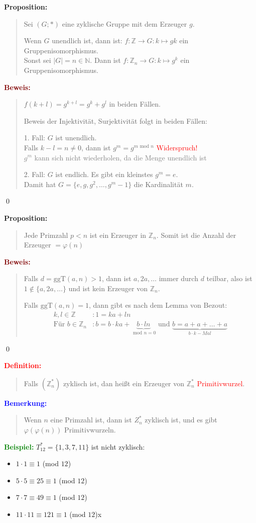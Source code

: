 \documentclass{article}
\newcommand{\red}[1]{\textcolor{red}{#1}}
\newcommand{\gray}[1]{\textcolor{gray}{#1}}
\newcommand{\blue}[1]{\textcolor{blue}{#1}}
\newcommand{\green}[1]{\textcolor{green}{#1}}
\newcommand{\dgr}[1]{\textcolor{dgr}{#1}}
\newcommand{\maroon}[1]{\textcolor{maroon}{#1}}
\newcommand{\ex}{\green{\textbf{Beispiel: }}}
\newcommand{\de}[1]{\red{\textbf{Definition: }}\begin{quote}#1\end{quote}}
\newcommand{\an}[1]{\blue{\textbf{Bemerkung: }}\begin{quote}#1\end{quote}}
\newcommand{\prop}[1]{\dgr{\textbf{Proposition: }}\begin{quote}#1\end{quote}}
\newcommand{\pr}[1]{\maroon{\textbf{Beweis: }}\begin{quote}#1\end{quote}\qed}
\newcommand{\N}{\mathbb{N}}
\newcommand{\Z}{\mathbb{Z}}
\renewcommand{\mod}{\text{ mod }}
\newcommand{\ggt}{\text{ggT}}
\begin{document}
\newpage
\prop{
    Sei $(G; *)$ eine zyklische Gruppe mit dem Erzeuger $g$.

    Wenn $G$ unendlich ist, dann ist: $f: \Z \to G: k \mapsto gk$ ein Gruppenisomorphismus.\\
    Sonst sei $|G| = n \in \N$. Dann ist $f: \Z_n \to G: k \mapsto g^k$ ein Gruppenisomorphismus.
}

\pr{
    $f(k + l) = g^{k+l} = g^k + g^l$ in beiden Fällen.

    Beweis der Injektivität, Surjektivität folgt in beiden Fällen:

    1. Fall: $G$ ist unendlich.\\
    Falls $k-l = n \ne 0$, dann ist $g^m = g^{m \mod n}$ \red{Widerspruch!}\\
    \gray{$g^m$ kann sich nicht wiederholen, da die Menge unendlich ist}

    2. Fall: $G$ ist endlich. Es gibt ein kleinstes $g^m = e$.\\
    Damit hat $G = \{e,g,g^2,\dots,g^m-1\}$ die Kardinalität $m$.
}

\prop{
    Jede Primzahl $p < n$ ist ein Erzeuger in $\Z_n$. Somit ist die Anzahl der Erzeuger $= \varphi(n)$
}

\pr{
    Falls $d = \ggt(a,n) > 1$, dann ist $a, 2a, \dots$ immer durch $d$ teilbar, also ist $1 \notin \{a,2a,\dots\}$ und ist kein Erzeuger von $\Z_n$.

    Falls $\ggt(a,n) = 1$, dann gibt es nach dem Lemma von Bezout:
    \begin{align*}
        k,l \in \Z&: 1 = ka + ln\\
        \text{Für } b \in \Z_n&: b = b \cdot ka + \underbrace{b \cdot ln }_{\mod n = 0}\text{ und } \underbrace{b = a + a + \dots + a}_{b \cdot k-Mal}
    \end{align*}
}

\de{
    Falls $(\Z_n^*)$ zyklisch ist, dan heißt ein Erzeuger von $\Z_n^*$ \red{Primitivwurzel}.
}

\an{
    Wenn $n$ eine Primzahl ist, dann ist $Z_n^*$ zyklisch ist, und es gibt $\varphi(\varphi(n))$ Primitivwurzeln.
}

\newpage
\ex $T_{12}^* = \{1,3,7,11\}$ ist nicht zyklisch:
\begin{itemize}
    \item $1 \cdot 1 \equiv 1$ (mod $12$)
    \item $5 \cdot 5 \equiv 25 \equiv 1$ (mod $12$)
    \item $7 \cdot 7 \equiv 49 \equiv 1$ (mod $12$)
    \item $11 \cdot 11 \equiv 121 \equiv 1$ (mod $12$)x
\end{itemize}
\end{document}
